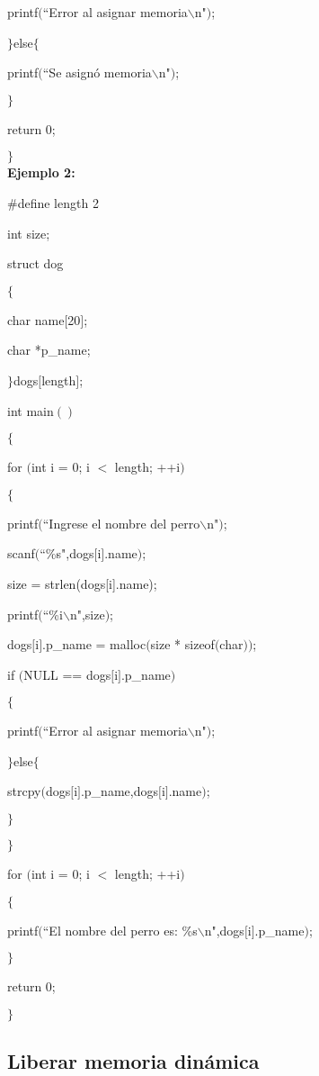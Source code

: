\documentclass[]{article}
\begin{document}
	printf$($``Error al asignar memoria$\backslash$n"$)$;
	
	$\rbrace$else$\lbrace$
	
	printf$($``Se asignó memoria$\backslash$n"$)$;
	
	$\rbrace$
	
	return 0;
	
	$\rbrace$\\
	
	
	\textbf{Ejemplo 2:\\}
	
	\#define length 2
	
	int size;
	
	struct dog
	
	$\lbrace$
	
	char name$[$20$]$;
	
	char *p\_name;
	
	$\rbrace$dogs$[$length$]$;
	
	int main$()$
	
	$\lbrace$
	
	for $($int i = 0; i $<$ length; ++i$)$
	
	$\lbrace$
	
	printf$($``Ingrese el nombre del perro$\backslash$n"$)$;
	
	scanf$($``\%s",dogs$[$i$]$.name$)$;
	
	size = strlen(dogs[i].name);
	
	printf$($``\%i$\backslash$n",size$)$;
	
	dogs$[$i$]$.p\_name = malloc$($size * sizeof$($char$))$;
	
	if $($NULL == dogs$[$i$]$.p\_name$)$
	
	$\lbrace$
	
	printf$($``Error al asignar memoria$\backslash$n"$)$;
	
	$\rbrace$else$\lbrace$
	
	strcpy$($dogs$[$i$]$.p\_name,dogs$[$i$]$.name$)$;
	
	$\rbrace$
	
	$\rbrace$
	
	for $($int i = 0; i $<$ length; ++i$)$
	
	$\lbrace$
	
	printf$($``El nombre del perro es: \%s$\backslash$n",dogs$[$i$]$.p\_name$)$;
	
	$\rbrace$
	
	return 0;
	
	$\rbrace$
	
	\subsection{Liberar memoria dinámica}
	
\end{document}
